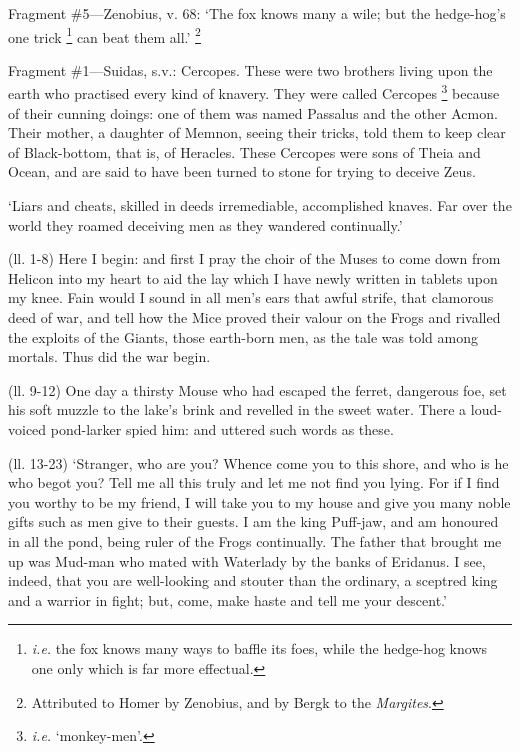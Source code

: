 Fragment \#5—Zenobius, v. 68: ‘The fox knows many a wile; but the
hedge-hog’s one trick \footnote{\emph{i.e.} the fox knows
many ways to baffle its foes, while the hedge-hog knows one only which is far
more effectual.} can beat them all.’ \footnote{Attributed to Homer by
Zenobius, and by Bergk to the \emph{Margites}.}


Fragment \#1—Suidas, s.v.: Cercopes. These were two brothers living upon
the earth who practised every kind of knavery. They were called Cercopes \footnote{\emph{i.e.}
‘monkey-men’.} because of their cunning doings:
one of them was named Passalus and the other Acmon. Their mother, a daughter of
Memnon, seeing their tricks, told them to keep clear of Black-bottom, that is,
of Heracles. These Cercopes were sons of Theia and Ocean, and are said to have
been turned to stone for trying to deceive Zeus.

‘Liars and cheats, skilled in deeds irremediable, accomplished knaves.
Far over the world they roamed deceiving men as they wandered
continually.’


(ll. 1-8) Here I begin: and first I pray the choir of the Muses to come down
from Helicon into my heart to aid the lay which I have newly written in tablets
upon my knee. Fain would I sound in all men’s ears that awful strife,
that clamorous deed of war, and tell how the Mice proved their valour on the
Frogs and rivalled the exploits of the Giants, those earth-born men, as the
tale was told among mortals. Thus did the war begin.

(ll. 9-12) One day a thirsty Mouse who had escaped the ferret, dangerous foe,
set his soft muzzle to the lake’s brink and revelled in the sweet water.
There a loud-voiced pond-larker spied him: and uttered such words as these.

(ll. 13-23) ‘Stranger, who are you? Whence come you to this shore, and
who is he who begot you? Tell me all this truly and let me not find you lying.
For if I find you worthy to be my friend, I will take you to my house and give
you many noble gifts such as men give to their guests. I am the king Puff-jaw,
and am honoured in all the pond, being ruler of the Frogs continually. The
father that brought me up was Mud-man who mated with Waterlady by the banks of
Eridanus. I see, indeed, that you are well-looking and stouter than the
ordinary, a sceptred king and a warrior in fight; but, come, make haste and
tell me your descent.’


